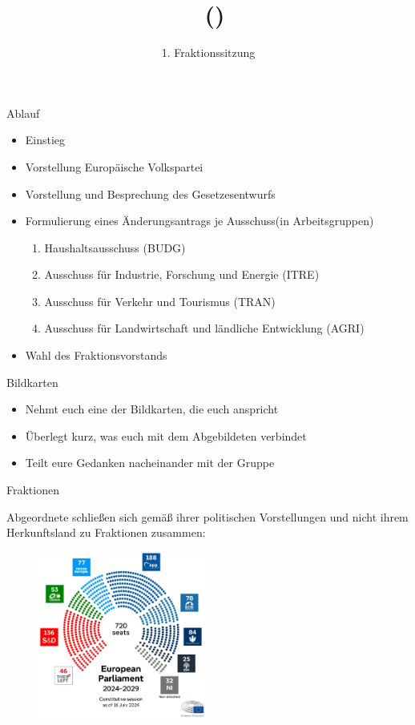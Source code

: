 \documentclass{beamer}
\title{\Fraktionsname\ (\Fraktionskuerzel)}
\subtitle{1. Fraktionssitzung}
\newcommand{\Fraktionsname}{Europäische Volkspartei}
\newcommand{\Fraktionsname}{Progressive Allianz der Sozialdemokraten}
\newcommand{\Fraktionsname}{Renew Europe}
\newcommand{\Fraktionsname}{Die Grünen/Europäische Freie Allianz}
\newcommand{\Fraktionsname}{Identität \& Demokratie}
\newcommand{\ausschuesse}{
   		     \begin{enumerate}
        		    \item Haushaltsausschuss (BUDG)
            		\item Ausschuss für Industrie, Forschung und Energie (ITRE)
    	    		    \item Ausschuss für Verkehr und Tourismus (TRAN)
    		        \item Ausschuss für Landwirtschaft und ländliche Entwicklung (AGRI)
	        \end{enumerate}
		}
\newcommand{\ausschuesse}{
            \begin{enumerate}
                \item Ausschuss für bürgerliche Freiheiten, Justiz und Inneres (LIBE)
                \item Ausschuss für Auswärtige Angelegenheiten (AFET)
                \item Unterausschuss für Menschenrechte (DROI)
            \end{enumerate}
    		}
\newcommand{\ausschuesse}{
            \begin{enumerate}
                \item Haushaltsausschuss (BUDG)
                \item Ausschuss für bürgerliche Freiheiten, Justiz und Inneres (LIBE)
                \item Unterausschuss für Sicherheit und Verteidigung (SEDE)
            \end{enumerate}
    		}
\begin{document}
\frame{\titlepage}



\begin{frame}{Ablauf}
\vspace{-1.5cm}
\begin{itemize}
    \item Einstieg
    \item Vorstellung \Fraktionsname
    \item Vorstellung und Besprechung des Gesetzesentwurfs
    \item Formulierung eines Änderungsantrags je Ausschuss\newline (in Arbeitsgruppen)
    \ausschuesse
    \item Wahl des Fraktionsvorstands
\end{itemize}
\end{frame}

\begin{frame}{Bildkarten}
\vspace{-1cm}
\begin{itemize}
    \item Nehmt euch eine der Bildkarten, die euch anspricht
    \item Überlegt kurz, was euch mit dem Abgebildeten verbindet
    \item Teilt eure Gedanken nacheinander mit der Gruppe
\end{itemize}
\end{frame}

\begin{frame}{Fraktionen}
\vspace{-0.5cm}
\begin{center}
    Abgeordnete schließen sich gemäß ihrer politischen Vorstellungen und nicht ihrem Herkunftsland zu Fraktionen zusammen:
\end{center}
\begin{figure}[h]
    \centering
    \includegraphics[height=5.5cm]{Bilder/EP_seats.jpg}
\end{figure}
\end{frame}
\end{document}
